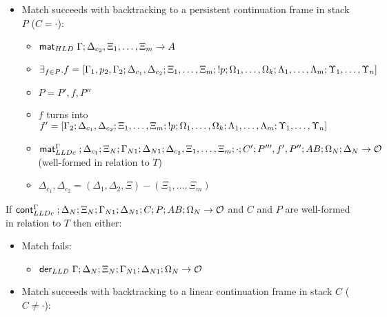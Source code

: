 \begin{lemma}
\begin{itemize}[leftmargin=*]
      \item Match succeeds with backtracking to a persistent continuation frame
      in stack $P$ ($C = \cdot$):
      \begin{itemize}[leftmargin=\secondm]
         \item $\mathsf{mat}_{HLD} \; \Gamma; \Delta_{c_2}, \Xi_1, \dotsc, \Xi_m \rightarrow A$
         \item $\exists_{f \in P}. f = [\Gamma_1, p_2, \Gamma_2; \Delta_{c_1}, \Delta_{c_2};
      \Xi_1, \dotsc, \Xi_m; {!} p; \Omega_1, \dotsc, \Omega_k; \Lambda_1,
      \dotsc, \Lambda_m; \Upsilon_1, \dotsc, \Upsilon_n]$
         \item $P = P', f, P''$
         \item $f$ turns into $f' = [\Gamma_2; \Delta_{c_1},
            \Delta_{c_2}; \Xi_1, \dotsc, \Xi_m; {!} p; \Omega_1, \dotsc,
            \Omega_k; \Lambda_1, \dotsc, \Lambda_m; \Upsilon_1, \dotsc, \Upsilon_n]$
         \item $\mathsf{mat}_{LLDc}^{\Gamma} \;; \Delta_{c_1}; \Xi_N; \Gamma_{N1}; \Delta_{N1};
         \Delta_{c_2}, \Xi_1, \dotsc, \Xi_m; \cdot; C'; P''', f', P'';
         AB; \Omega_N; \Delta_N \rightarrow \mathcal{O}$
         (well-formed in relation to $T$)
         \item $\Delta_{c_1}, \Delta_{c_2} = (\Delta_1, \Delta_2, \Xi) - (\Xi_1, \dotsc,
               \Xi_m)$
      \end{itemize}
   \end{itemize}
   
If $\mathsf{cont}_{LLDc}^{\Gamma} \;; \Delta_{N}; \Xi_{N}; \Gamma_{N1}; \Delta_{N1}; C; P;
AB; \Omega_N \rightarrow \mathcal{O}$ and $C$ and $P$ are
well-formed in relation to $T$ then either:

\begin{itemize}[leftmargin=*]
   \item Match fails:
   \begin{itemize}[leftmargin=\secondm]
      \item $\mathsf{der}_{LLD} \; \Gamma; \Delta_N; \Xi_N; \Gamma_{N1}; \Delta_{N1}; \Omega_N \rightarrow \mathcal{O}$
   \end{itemize}

   \item Match succeeds with backtracking to a linear continuation frame in
   stack $C$ ($C \neq \cdot$):


\end{itemize}
\end{lemma}
